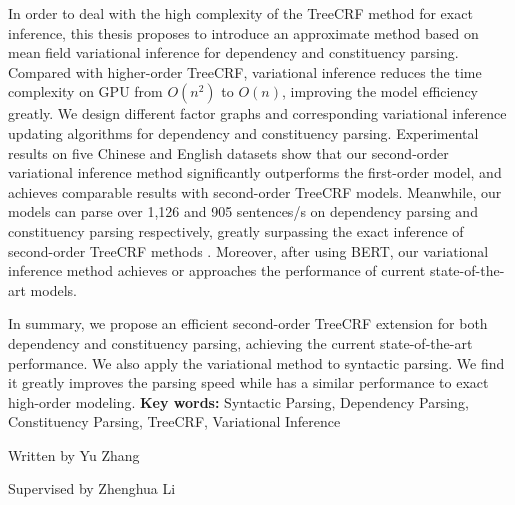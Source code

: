 \begin{eabstract}
\begin{enumerate}
          In order to deal with the high complexity of the TreeCRF method for exact inference, this thesis proposes to introduce an approximate method based on mean field variational inference for dependency and constituency parsing.
          Compared with higher-order TreeCRF, variational inference reduces the time complexity on GPU from $O(n^2)$ to $O(n)$, improving the model efficiency greatly.
          We design different factor graphs and corresponding variational inference updating algorithms for dependency and constituency parsing.
          Experimental results on five Chinese and English datasets show that our second-order variational inference method significantly outperforms the first-order model, and achieves comparable results with second-order TreeCRF models.
          Meanwhile, our models can parse over 1,126 and 905 sentences/s on dependency parsing and constituency parsing respectively, greatly surpassing the exact inference of second-order TreeCRF methods .
          Moreover, after using BERT, our variational inference method achieves or approaches the performance of current state-of-the-art models.
  \end{enumerate}

  In summary, we propose an efficient second-order TreeCRF extension for both dependency and constituency parsing, achieving the current state-of-the-art performance.
  We also apply the variational method to syntactic parsing.
  We find it greatly improves the parsing speed while has a similar performance to exact high-order modeling.
  \vskip 21bp
    {\bf{} Key words: }
  Syntactic Parsing,
  Dependency Parsing,
  Constituency Parsing,
  TreeCRF,
  Variational Inference
\end{eabstract}

\begin{flushright}
  Written by Yu Zhang

  Supervised by Zhenghua Li
\end{flushright}
